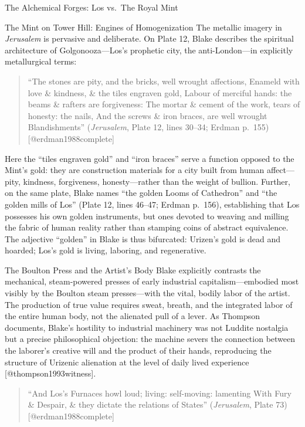 \documentclass[
  ignorenonframetext,
]{beamer}
\begin{document}
\begin{frame}{The Alchemical Forges: Los vs.~The Royal Mint}
\begin{block}{The Mint on Tower Hill: Engines of Homogenization}
The metallic imagery in \emph{Jerusalem} is pervasive and deliberate. On
Plate 12, Blake describes the spiritual architecture of
Golgonooza---Los's prophetic city, the anti-London---in explicitly
metallurgical terms:

\begin{quote}
``The stones are pity, and the bricks, well wrought affections, Enameld
with love \& kindness, \& the tiles engraven gold, Labour of merciful
hands: the beams \& rafters are forgiveness: The mortar \& cement of the
work, tears of honesty: the nails, And the screws \& iron braces, are
well wrought Blandishments'' (\emph{Jerusalem}, Plate 12, lines 30--34;
Erdman p.~155) {[}@erdman1988complete{]}
\end{quote}

Here the ``tiles engraven gold'' and ``iron braces'' serve a function
opposed to the Mint's gold: they are construction materials for a city
built from human affect---pity, kindness, forgiveness, honesty---rather
than the weight of bullion. Further, on the same plate, Blake names
``the golden Looms of Cathedron'' and ``the golden mills of Los'' (Plate
12, lines 46--47; Erdman p.~156), establishing that Los possesses his
own golden instruments, but ones devoted to weaving and milling the
fabric of human reality rather than stamping coins of abstract
equivalence. The adjective ``golden'' in Blake is thus bifurcated:
Urizen's gold is dead and hoarded; Los's gold is living, laboring, and
regenerative.
\end{block}

\begin{block}{The Boulton Press and the Artist's Body}
\protect{}\label{the-boulton-press-and-the-artists-body}
Blake explicitly contrasts the mechanical, steam-powered presses of
early industrial capitalism---embodied most visibly by the Boulton steam
presses---with the vital, bodily labor of the artist. The production of
true value requires sweat, breath, and the integrated labor of the
entire human body, not the alienated pull of a lever. As Thompson
documents, Blake's hostility to industrial machinery was not Luddite
nostalgia but a precise philosophical objection: the machine severs the
connection between the laborer's creative will and the product of their
hands, reproducing the structure of Urizenic alienation at the level of
daily lived experience {[}@thompson1993witness{]}.

\begin{quote}
``And Los's Furnaces howl loud; living: self-moving: lamenting With Fury
\& Despair, \& they dictate the relations of States'' (\emph{Jerusalem},
Plate 73) {[}@erdman1988complete{]}
\end{quote}


\end{block}
\end{frame}
\end{document}
